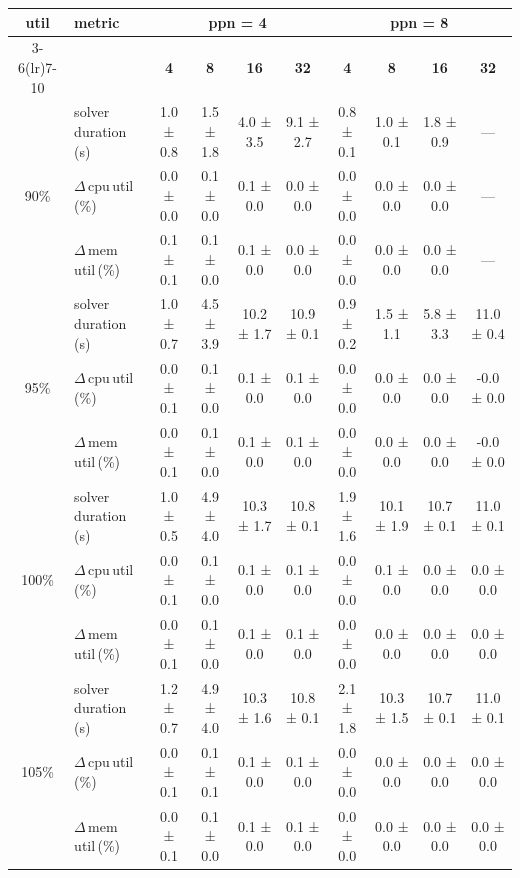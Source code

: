 \begin{tabular}{@{}c l *{8}{c}@{}}
\toprule
\multirow{2}{*}{\textbf{util}} & \multirow{2}{*}{\textbf{metric}} &\multicolumn{4}{c}{\textbf{ppn = 4}} & \multicolumn{4}{c}{\textbf{ppn = 8}}\\
\cmidrule(lr){3-6}\cmidrule(lr){7-10}
 &  & \textbf{4} & \textbf{8} & \textbf{16} & \textbf{32} & \textbf{4} & \textbf{8} & \textbf{16} & \textbf{32}\\
\midrule
\multirow{3}{*}{90\%}
& solver\,duration\,(s) & 1.0 ± 0.8 & 1.5 ± 1.8 & 4.0 ± 3.5 & 9.1 ± 2.7 & 0.8 ± 0.1 & 1.0 ± 0.1 & 1.8 ± 0.9 & \multicolumn{1}{c}{—} \\
& $\Delta$\,cpu\,util\,(\%) & 0.0 ± 0.0 & 0.1 ± 0.0 & 0.1 ± 0.0 & 0.0 ± 0.0 & 0.0 ± 0.0 & 0.0 ± 0.0 & 0.0 ± 0.0 & \multicolumn{1}{c}{—} \\
& $\Delta$\,mem\,util\,(\%) & 0.1 ± 0.1 & 0.1 ± 0.0 & 0.1 ± 0.0 & 0.0 ± 0.0 & 0.0 ± 0.0 & 0.0 ± 0.0 & 0.0 ± 0.0 & \multicolumn{1}{c}{—} \\
\midrule
\multirow{3}{*}{95\%}
& solver\,duration\,(s) & 1.0 ± 0.7 & 4.5 ± 3.9 & 10.2 ± 1.7 & 10.9 ± 0.1 & 0.9 ± 0.2 & 1.5 ± 1.1 & 5.8 ± 3.3 & 11.0 ± 0.4 \\
& $\Delta$\,cpu\,util\,(\%) & 0.0 ± 0.1 & 0.1 ± 0.0 & 0.1 ± 0.0 & 0.1 ± 0.0 & 0.0 ± 0.0 & 0.0 ± 0.0 & 0.0 ± 0.0 & -0.0 ± 0.0 \\
& $\Delta$\,mem\,util\,(\%) & 0.0 ± 0.1 & 0.1 ± 0.0 & 0.1 ± 0.0 & 0.1 ± 0.0 & 0.0 ± 0.0 & 0.0 ± 0.0 & 0.0 ± 0.0 & -0.0 ± 0.0 \\
\midrule
\multirow{3}{*}{100\%}
& solver\,duration\,(s) & 1.0 ± 0.5 & 4.9 ± 4.0 & 10.3 ± 1.7 & 10.8 ± 0.1 & 1.9 ± 1.6 & 10.1 ± 1.9 & 10.7 ± 0.1 & 11.0 ± 0.1 \\
& $\Delta$\,cpu\,util\,(\%) & 0.0 ± 0.1 & 0.1 ± 0.0 & 0.1 ± 0.0 & 0.1 ± 0.0 & 0.0 ± 0.0 & 0.1 ± 0.0 & 0.0 ± 0.0 & 0.0 ± 0.0 \\
& $\Delta$\,mem\,util\,(\%) & 0.0 ± 0.1 & 0.1 ± 0.0 & 0.1 ± 0.0 & 0.1 ± 0.0 & 0.0 ± 0.0 & 0.0 ± 0.0 & 0.0 ± 0.0 & 0.0 ± 0.0 \\
\midrule
\multirow{3}{*}{105\%}
& solver\,duration\,(s) & 1.2 ± 0.7 & 4.9 ± 4.0 & 10.3 ± 1.6 & 10.8 ± 0.1 & 2.1 ± 1.8 & 10.3 ± 1.5 & 10.7 ± 0.1 & 11.0 ± 0.1 \\
& $\Delta$\,cpu\,util\,(\%) & 0.0 ± 0.1 & 0.1 ± 0.1 & 0.1 ± 0.0 & 0.1 ± 0.0 & 0.0 ± 0.0 & 0.0 ± 0.0 & 0.0 ± 0.0 & 0.0 ± 0.0 \\
& $\Delta$\,mem\,util\,(\%) & 0.0 ± 0.1 & 0.1 ± 0.0 & 0.1 ± 0.0 & 0.1 ± 0.0 & 0.0 ± 0.0 & 0.0 ± 0.0 & 0.0 ± 0.0 & 0.0 ± 0.0 \\
\bottomrule
\end{tabular}

